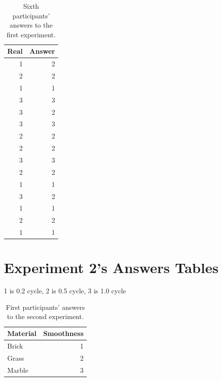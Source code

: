 \documentclass[uplatex,
12pt, %
a4paper,
english, %
oneside,
titlepage,
singlespacing, %
liststotoc, %
headsepline,
]{MastersDoctoralThesis} %
\begin{document}
\begin{appendices}
\begin{table}[H]
  \centering
  \caption{Sixth participants' answers to the first experiment.}
    \begin{tabular}{|r|r|}
    \toprule
    \multicolumn{1}{|l|}{Real} & \multicolumn{1}{l|}{Answer} \\
    \midrule
    1     & 2 \\
    \midrule
    2     & 2 \\
    \midrule
    1     & 1 \\
    \midrule
    3     & 3 \\
    \midrule
    3     & 2 \\
    \midrule
    3     & 3 \\
    \midrule
    2     & 2 \\
    \midrule
    2     & 2 \\
    \midrule
    3     & 3 \\
    \midrule
    2     & 2 \\
    \midrule
    1     & 1 \\
    \midrule
    3     & 2 \\
    \midrule
    1     & 1 \\
    \midrule
    2     & 2 \\
    \midrule
    1     & 1 \\
    \bottomrule
    \end{tabular}%
  \label{tab:Ex1_6}%
\end{table}%

\chapter{Experiment 2's Answers Tables}
\label{appendix:b}
1 is 0.2 cycle, 2 is 0.5 cycle, 3 is 1.0 cycle
\begin{table}[H]
  \centering
  \caption{First participants' answers to the second experiment.}
    \begin{tabular}{|l|r|}
    \toprule
    \textbf{Material} & \multicolumn{1}{l|}{\textbf{Smoothness}} \\
    \midrule
    Brick & 1 \\
    \midrule
    Grass & 2 \\
    \midrule
    Marble & 3 \\
    \bottomrule
    \end{tabular}%
  \label{tab:Ex2_1}%
\end{table}%


\end{appendices}
\end{document}
